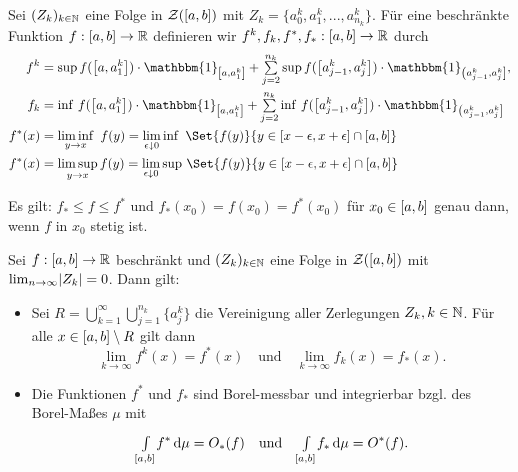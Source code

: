 \documentclass{cheat-sheet}
\newcommand{\ind}{\mathbbm{1}} %
\theoremstyle{definition}
\begin{document}
\begin{nota}
  Sei $(Z_k)_{k \in \mathbb{N}}$ eine Folge in $\mathcal{Z}(\left[ a, b \right])$ mit $Z_k = \{ a_0^k, a_1^k, ..., a^k_{n_k} \}$. Für eine beschränkte Funktion $f : \left[ a, b \right] \to \mathbb{R}$ definieren wir $f^k, f_k, f^*, f_* : \left[ a, b \right] \to \mathbb{R}$ durch
  \begin{align*}
    f^k &= \sup f(\cinterval{a}{a_1^k}) \cdot \ind_{\cinterval{a}{a_1^k}} + \sum_{j=2}^{n_k} \sup f(\cinterval{a_{j-1}^k}{a_j^k}) \cdot \ind_{\ocinterval{a_{j-1}^k}{a_j^k}},\\
    f_k &= \inf \, f(\cinterval{a}{a_1^k}) \cdot \ind_{\cinterval{a}{a_1^k}} + \sum_{j=2}^{n_k} \inf \, f(\cinterval{a_{j-1}^k}{a_j^k}) \cdot \ind_{\ocinterval{a_{j-1}^k}{a_j^k}}\\
    f^*(x) &= \liminf_{y \to x}\,\, f(y) = \lim_{\epsilon \downarrow 0} \inf\,\, \Set{ f(y) }{ y \in [x-\epsilon, x+\epsilon] \cap \cinterval{a}{b}}\\
    f^*(x) &= \limsup_{y \to x} f(y) = \lim_{\epsilon \downarrow 0} \sup \, \Set{ f(y) }{ y \in [x-\epsilon, x+\epsilon] \cap \cinterval{a}{b}}
  \end{align*}
\end{nota}

\begin{bem}
  Es gilt: $f_* \leq f \leq f^*$ und $f_*(x_0) = f(x_0) = f^*(x_0)$ für $x_0 \in \left[ a, b \right]$ genau dann, wenn $f$ in $x_0$ stetig ist.
\end{bem}

\begin{satz}
  Sei $f : \left[ a, b \right] \to \mathbb{R}$ beschränkt und $(Z_k)_{k \in \mathbb{N}}$ eine Folge in $\mathcal{Z}(\left[ a, b \right])$ mit $\lim_{n \to \infty} \lvert Z_k\rvert = 0$. Dann gilt:
  \begin{itemize}
    \item Sei $R = \bigcup_{k=1}^\infty \bigcup_{j=1}^{n_k} \{ a_j^k \}$ die Vereinigung aller Zerlegungen $Z_k, k \in \mathbb{N}$. Für alle $x \in \left[ a, b \right] \setminus R$ gilt dann
    \[
      \lim_{k \to \infty} f^k(x) = f^*(x)
      \quad \text{und} \quad
      \lim_{k \to \infty} f_k(x) = f_*(x).
    \]
    \item Die Funktionen $f^*$ und $f_*$ sind Borel-messbar und integrierbar bzgl. des Borel-Maßes $\mu$ mit
    \[ {\textstyle \int\limits_{\left[ a, b \right]}^{}} f^* \,\mathrm{d} \mu = O_*(f) \quad \text{und} \quad {\textstyle \int\limits_{\left[ a, b \right]}^{}} f_* \,\mathrm{d} \mu = O^*(f). \]
  \end{itemize}
\end{satz}
\end{document}

